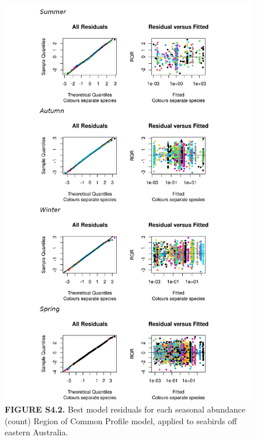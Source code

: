 \documentclass[
]{article}
\begin{document}
\begin{figure}
\centering
\includegraphics{../results/FigS4_2_best-model-residuals-NegBin.png}
\caption{\textbf{FIGURE S4.2.} Best model residuals for each seasonal
abundance (count) Region of Common Profile model, applied to seabirds
off eastern Australia.}
\end{figure}

\newpage
\end{document}
